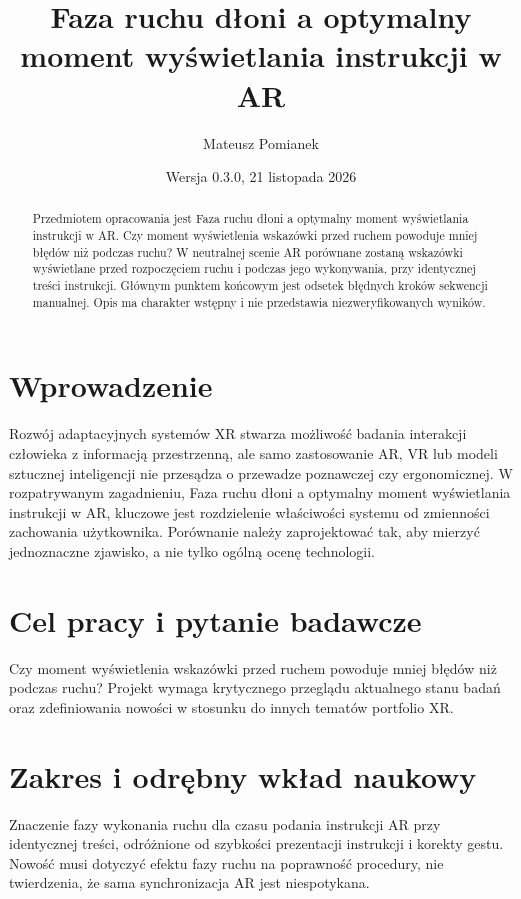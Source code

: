 \documentclass[11pt,a4paper]{article}
\title{Faza ruchu dłoni a optymalny moment wyświetlania instrukcji w AR}
\author{Mateusz Pomianek}
\date{Wersja 0.3.0, 21 listopada 2026}
\begin{document}
\maketitle

\begin{abstract}

Przedmiotem opracowania jest Faza ruchu dłoni a optymalny moment wyświetlania instrukcji w AR. Czy moment wyświetlenia wskazówki przed ruchem powoduje mniej błędów niż podczas ruchu? W neutralnej scenie AR porównane zostaną wskazówki wyświetlane przed rozpoczęciem ruchu i podczas jego wykonywania, przy identycznej treści instrukcji. Głównym punktem końcowym jest odsetek błędnych kroków sekwencji manualnej. Opis ma charakter wstępny i nie przedstawia niezweryfikowanych wyników.

\end{abstract}

\section{Wprowadzenie}

Rozwój adaptacyjnych systemów XR stwarza możliwość badania interakcji człowieka z informacją przestrzenną, ale samo zastosowanie AR, VR lub modeli sztucznej inteligencji nie przesądza o przewadze poznawczej czy ergonomicznej. W rozpatrywanym zagadnieniu, Faza ruchu dłoni a optymalny moment wyświetlania instrukcji w AR, kluczowe jest rozdzielenie właściwości systemu od zmienności zachowania użytkownika. Porównanie należy zaprojektować tak, aby mierzyć jednoznaczne zjawisko, a nie tylko ogólną ocenę technologii.

\section{Cel pracy i pytanie badawcze}

Czy moment wyświetlenia wskazówki przed ruchem powoduje mniej błędów niż podczas ruchu? Projekt wymaga krytycznego przeglądu aktualnego stanu badań oraz zdefiniowania nowości w stosunku do innych tematów portfolio XR.

\section{Zakres i odrębny wkład naukowy}
Znaczenie fazy wykonania ruchu dla czasu podania instrukcji AR przy identycznej treści, odróżnione od szybkości prezentacji instrukcji i korekty gestu. Nowość musi dotyczyć efektu fazy ruchu na poprawność procedury, nie twierdzenia, że sama synchronizacja AR jest niespotykana.
\end{document}
